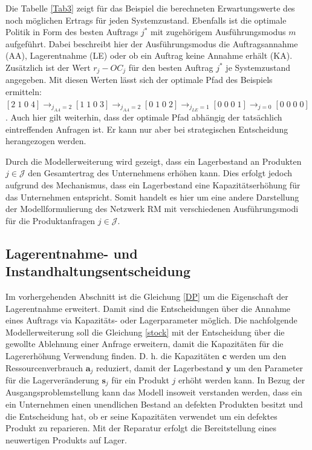 Die Tabelle \ref{Tab3} zeigt für das Beispiel die berechneten Erwartungswerte des noch möglichen Ertrags für jeden Systemzustand. Ebenfalls ist die optimale Politik in Form des besten Auftrags $j^*$ mit zugehörigem Ausführungsmodus $m$ aufgeführt. Dabei beschreibt hier der Ausführungsmodus die Auftragsannahme (AA), Lagerentnahme (LE) oder ob ein Auftrag keine Annahme erhält (KA). Zusätzlich ist der Wert $r_{j}-OC_{j}$ für den besten Auftrag $j^*$ je Systemzustand angegeben. Mit diesen Werten lässt sich der optimale Pfad des Beispiels ermitteln: $[2\;1\;0\;4] \rightarrow_{j_{AA}=2} [1\;1\;0\;3] \rightarrow_{j_{AA}=2} [0\;1\;0\;2] \rightarrow_{j_{LE}=1} [0\;0\;0\;1]\rightarrow_{j=0} [0\;0\;0\;0]$. Auch hier gilt weiterhin, dass der optimale Pfad abhängig der tatsächlich eintreffenden Anfragen ist. Er kann nur aber bei strategischen Entscheidung herangezogen werden.

Durch die Modellerweiterung wird gezeigt, dass ein Lagerbestand an Produkten $j\in\mathcal{J}$ den Gesamtertrag des Unternehmens erhöhen kann. Dies erfolgt jedoch aufgrund des Mechanismus, dass ein Lagerbestand eine Kapazitätserhöhung für das Unternehmen entspricht. Somit handelt es hier um eine andere Darstellung der Modellformulierung des Netzwerk RM mit verschiedenen Ausführungsmodi für die Produktanfragen $j\in\mathcal{J}$. %

\subsection{Lagerentnahme- und Instandhaltungsentscheidung}

Im vorhergehenden Abschnitt ist die Gleichung \eqref{DP} um die Eigenschaft der Lagerentnahme erweitert. Damit sind die Entscheidungen über die Annahme eines Auftrags via Kapazitäts- oder Lagerparameter möglich. Die nachfolgende Modellerweiterung soll die Gleichung \eqref{stock} mit der Entscheidung über die gewollte Ablehnung einer Anfrage erweitern, damit die Kapazitäten für die Lagererhöhung Verwendung finden. D. h. die Kapazitäten $\textbf{c}$ werden um den Ressourcenverbrauch $\textbf{a}_{j}$ reduziert, damit der Lagerbestand $\textbf{y}$ um den Parameter für die Lagerveränderung $\textbf{s}_{j}$ für ein Produkt $j$ erhöht werden kann. In Bezug der Ausgangsproblemstellung kann das Modell insoweit verstanden werden, dass ein ein Unternehmen einen unendlichen Bestand an defekten Produkten besitzt und die Entscheidung hat, ob er seine Kapazitäten verwendet um ein defektes Produkt zu reparieren. Mit der Reparatur erfolgt die Bereitstellung eines neuwertigen Produkts auf Lager.

